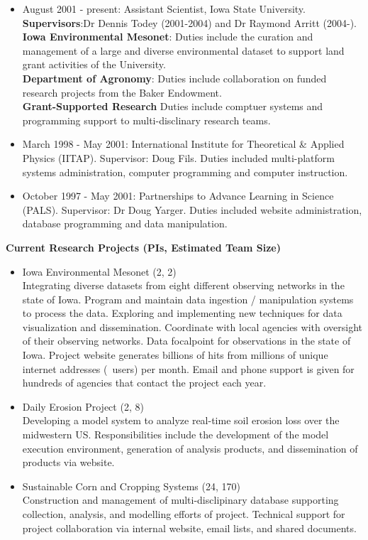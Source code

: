 \begin{itemize}
\item August 2001 - present: Assistant Scientist, Iowa State University.\\
 \textbf{Supervisors}:Dr Dennis Todey (2001-2004) and Dr Raymond Arritt (2004-).  \\
\textbf{Iowa Environmental Mesonet}: Duties include the curation and management
 of a large and diverse environmental dataset to support land grant activities
 of the University. \\
\textbf{Department of Agronomy}: Duties include collaboration on funded 
 research projects from the Baker Endowment. \\
\textbf{Grant-Supported Research} Duties include comptuer systems
 and programming support to multi-disclinary research teams. 

\item March 1998 - May 2001: International Institute for Theoretical \& Applied 
Physics (IITAP).  Supervisor: Doug Fils. Duties included multi-platform 
systems administration, computer programming and computer instruction.
\item October 1997 - May 2001: Partnerships to Advance Learning in Science
(PALS).  Supervisor: Dr Doug Yarger.  Duties included website administration,
database programming and data manipulation.
\end{itemize}
\vspace*{0.25in}
\Large \bf Current Research Projects (PIs, Estimated Team Size)
\normalsize \sf
\begin{itemize}
\item Iowa Environmental Mesonet (2, 2)\\
 Integrating diverse datasets from eight
different observing networks in the state of Iowa.  Program and maintain data
ingestion / manipulation systems to process the data. Exploring and implementing 
new techniques for data visualization and dissemination.  Coordinate with local
agencies with oversight of their observing networks.  Data focalpoint for 
observations in the state of Iowa. Project website generates billions of hits 
from millions of unique internet addresses (~users) per month.  Email and 
phone support is given for hundreds of agencies that contact the project each
year.
\item Daily Erosion Project (2, 8)\\
Developing a model system to analyze real-time soil erosion loss over the 
midwestern US.  Responsibilities include the development of the model execution
environment, generation of analysis products, and dissemination of products 
via website.
\item Sustainable Corn and Cropping Systems (24, 170)\\
Construction and management of multi-disclipinary database supporting collection, analysis, and modelling efforts of project.  Technical support for project
collaboration via internal website, email lists, and shared documents.
\end{itemize}
